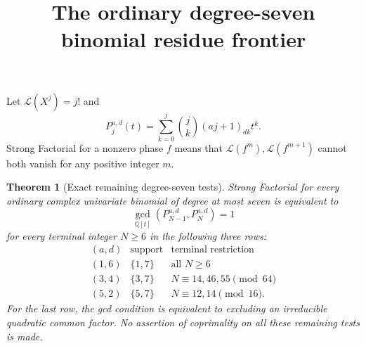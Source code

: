 \documentclass[11pt]{article}
\newtheorem{theorem}{Theorem}
\begin{document}
\setlength{\emergencystretch}{1em}
\title{The ordinary degree-seven binomial residue frontier}
\author{}\date{}\maketitle
Let $\mathcal L(X^j)=j!$ and
\[
 P_j^{a,d}(t)=\sum_{k=0}^j\binom jk(aj+1)_{dk}t^k.
\]
Strong Factorial for a nonzero phase $f$ means that
$\mathcal L(f^m),\mathcal L(f^{m+1})$ cannot both vanish for any
positive integer $m$.

\begin{theorem}[Exact remaining degree-seven tests]
\label{thm:residue-frontier}
Strong Factorial for every ordinary complex univariate binomial
of degree at most seven is equivalent to
\[
 \gcd_{\mathbb Q[t]}(P_{N-1}^{a,d},P_N^{a,d})=1
\]
for every terminal integer $N\ge6$ in the following three rows:
\[
 \begin{array}{c|c|l}
 (a,d)&\text{support}&\text{terminal restriction}\\ \hline
 (1,6)&\{1,7\}&\text{all }N\ge6\\
 (3,4)&\{3,7\}&N\equiv14,46,55\pmod{64}\\
 (5,2)&\{5,7\}&N\equiv12,14\pmod{16}.
 \end{array}
\]
For the last row, the gcd condition is equivalent to excluding an
irreducible quadratic common factor.
No assertion of coprimality on all these remaining tests is made.
\end{theorem}
\end{document}
